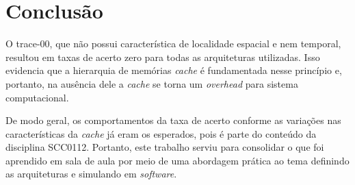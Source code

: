 \newpage
\section{Conclusão \label{sec:conclusao}}

O trace-00, que não possui característica de localidade espacial e nem temporal, resultou em taxas de acerto zero para todas as arquiteturas utilizadas. Isso evidencia que a hierarquia de memórias \textit{cache} é fundamentada nesse princípio e, portanto, na ausência dele a \textit{cache} se torna um \textit{overhead} para sistema computacional.

De modo geral, os comportamentos da taxa de acerto conforme as variações nas características da \textit{cache} já eram os esperados, pois é parte do conteúdo da disciplina SCC0112. Portanto, este trabalho serviu para consolidar o que foi aprendido em sala de aula por meio de uma abordagem prática ao tema definindo as arquiteturas e simulando em \textit{software}.

